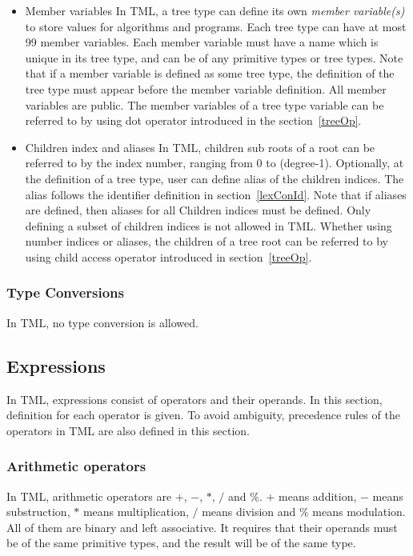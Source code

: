 \documentclass[12pt,psfig,a4]{article}
\begin{document}
\begin{itemize}

\item Member variables
In TML, a tree type can define its own \textit{member variable(s)} to store values for algorithms and programs. Each tree type can have at most 99 member variables. Each member variable must have a name which is unique in its tree type, and can be of any primitive types or tree types. Note that if a member variable is defined as some tree type, the definition of the tree type must appear before the member variable definition. All member variables are public. The member variables of a tree type variable can be referred to by using dot operator introduced in the section~\ref{treeOp}.


\item Children index and aliases
In TML, children sub roots of a root can be referred to by the index number, ranging from 0 to (degree-1). Optionally, at the definition of a tree type, user can define alias of the children indices. The alias follows the identifier definition in section~\ref{lexConId}. Note that if aliases are defined, then aliases for all Children indices must be defined. Only defining a subset of children indices is not allowed in TML. Whether using number indices or aliases, the children of a tree root can be referred to by using child access operator introduced in section~\ref{treeOp}.

\end{itemize}

\subsubsection {Type Conversions}
In TML, no type conversion is allowed.



\subsection{Expressions}
In TML, expressions consist of operators and their operands. In this section, definition for each operator is given. To avoid ambiguity, precedence rules of the operators in TML are also defined in this section.

\subsubsection{Arithmetic operators}
In TML, arithmetic operators are $+$, $-$, $*$, $/$ and $\%$. $+$ means addition, $-$ means substruction, $*$ means multiplication, $/$ means division and $\%$ means modulation. All of them are binary and left associative. It requires that their operands must be of the same primitive types, and the result will be of the same type.
\end{document}
